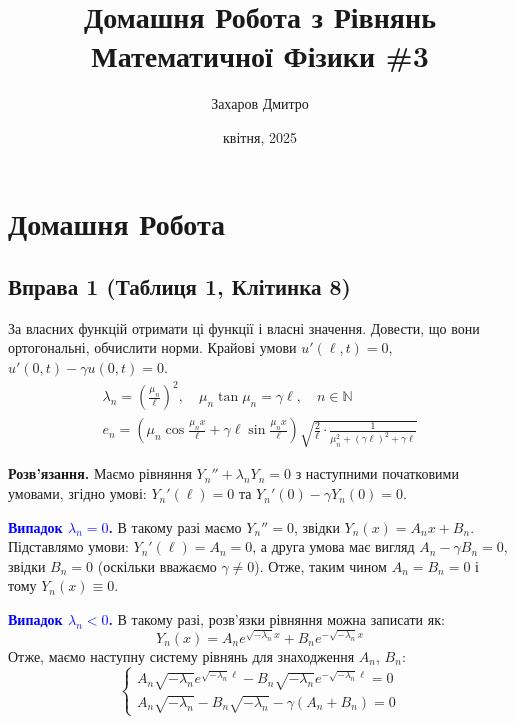 \documentclass{hw_template}
\title{\huge\sffamily\bfseries Домашня Робота з Рівнянь Математичної Фізики \#3}
\author{\Large\sffamily Захаров Дмитро}
\date{\sffamily 19 квітня, 2025}
\begin{document}
\pagestyle{fancy}

\maketitle

\tableofcontents

\pagebreak

\section{Домашня Робота}

\subsection{Вправа 1 (Таблиця 1, Клітинка 8)}

\begin{problem}
    За власних функцій отримати ці функції і власні значення. Довести, що 
    вони ортогональні, обчислити норми. Крайові умови $u'(\ell,t)=0$, 
    $u'(0,t)-\gamma u(0,t)=0$.
    \begin{gather*}
        \lambda_n = \left(\frac{\mu_n}{\ell}\right)^2, \quad \mu_n \tan \mu_n = \gamma \ell, \quad n \in \mathbb{N} \\
        e_n = \left(\mu_n \cos \frac{\mu_n x}{\ell} + \gamma \ell\sin\frac{\mu_n x}{\ell}\right)\sqrt{\frac{2}{\ell} \cdot \frac{1}{\mu_n^2 + (\gamma \ell)^2 + \gamma \ell}}
    \end{gather*}
\end{problem}

\textbf{Розв'язання.} Маємо рівняння $Y_n'' + \lambda_n Y_n = 0$ з наступними
початковими умовами, згідно умові: $Y_n'(\ell)=0$ та $Y_n'(0) - \gamma Y_n(0) = 0$. 

\textcolor{blue}{\textbf{Випадок $\lambda_n=0$.}} В такому разі маємо $Y_n''=0$, звідки 
$Y_n(x) = A_nx+B_n$. Підставлямо умови: $Y_n'(\ell) = A_n = 0$, а друга умова 
має вигляд $A_n - \gamma B_n = 0$, звідки $B_n=0$ (оскільки вважаємо $\gamma \neq 0$). 
Отже, таким чином $A_n=B_n=0$ і тому $Y_n(x) \equiv 0$.

\textcolor{blue}{\textbf{Випадок $\lambda_n < 0$.}} В такому разі, розв'язки
рівняння можна записати як: 
\begin{equation*}
    Y_n(x) = A_ne^{\sqrt{-\lambda_n}x} +
B_ne^{-\sqrt{-\lambda_n}x}    
\end{equation*}
Отже, маємо наступну систему рівнянь для
знаходження $A_n$, $B_n$:
\begin{equation*}
    \begin{cases}
        A_n\sqrt{-\lambda_n}e^{\sqrt{-\lambda_n}\ell} - B_n\sqrt{-\lambda_n}e^{-\sqrt{-\lambda_n}\ell} = 0 \\
        A_n\sqrt{-\lambda_n} - B_n\sqrt{-\lambda_n} - \gamma (A_n+B_n) = 0
    \end{cases}
\end{equation*}
\end{document}
